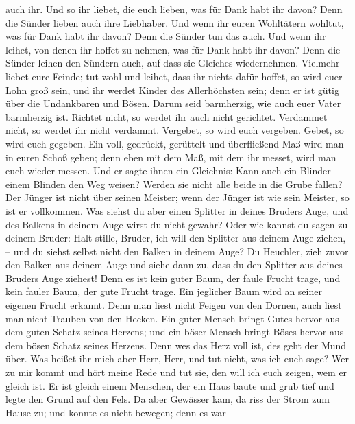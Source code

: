 auch ihr.  Und so ihr liebet, die euch lieben, was für Dank
habt ihr davon? Denn die Sünder lieben auch ihre Liebhaber.
 Und wenn ihr euren Wohltätern wohltut, was für Dank habt
ihr davon? Denn die Sünder tun das auch.  Und wenn ihr
leihet, von denen ihr hoffet zu nehmen, was für Dank habt ihr davon?
Denn die Sünder leihen den Sündern auch, auf dass sie Gleiches
wiedernehmen.  Vielmehr liebet eure Feinde; tut wohl und
leihet, dass ihr nichts dafür hoffet, so wird euer Lohn groß sein, und
ihr werdet Kinder des Allerhöchsten sein; denn er ist gütig über die
Undankbaren und Bösen.  Darum seid barmherzig, wie auch
euer Vater barmherzig ist.  Richtet nicht, so werdet ihr
auch nicht gerichtet. Verdammet nicht, so werdet ihr nicht verdammt.
Vergebet, so wird euch vergeben.  Gebet, so wird euch
gegeben. Ein voll, gedrückt, gerüttelt und überfließend Maß wird man in
euren Schoß geben; denn eben mit dem Maß, mit dem ihr messet, wird man
euch wieder messen.  Und er sagte ihnen ein Gleichnis: Kann
auch ein Blinder einem Blinden den Weg weisen? Werden sie nicht alle
beide in die Grube fallen?  Der Jünger ist nicht über
seinen Meister; wenn der Jünger ist wie sein Meister, so ist er
vollkommen.  Was siehst du aber einen Splitter in deines
Bruders Auge, und des Balkens in deinem Auge wirst du nicht gewahr?
 Oder wie kannst du sagen zu deinem Bruder: Halt stille,
Bruder, ich will den Splitter aus deinem Auge ziehen, -- und du siehst
selbst nicht den Balken in deinem Auge? Du Heuchler, zieh zuvor den
Balken aus deinem Auge und siehe dann zu, dass du den Splitter aus
deines Bruders Auge ziehest!  Denn es ist kein guter Baum,
der faule Frucht trage, und kein fauler Baum, der gute Frucht trage.
 Ein jeglicher Baum wird an seiner eigenen Frucht erkannt.
Denn man liest nicht Feigen von den Dornen, auch liest man nicht Trauben
von den Hecken.  Ein guter Mensch bringt Gutes hervor aus
dem guten Schatz seines Herzens; und ein böser Mensch bringt Böses
hervor aus dem bösen Schatz seines Herzens. Denn wes das Herz voll ist,
des geht der Mund über.  Was heißet ihr mich aber Herr,
Herr, und tut nicht, was ich euch sage?  Wer zu mir kommt
und hört meine Rede und tut sie, den will ich euch zeigen, wem er gleich
ist.  Er ist gleich einem Menschen, der ein Haus baute und
grub tief und legte den Grund auf den Fels. Da aber Gewässer kam, da
riss der Strom zum Hause zu; und konnte es nicht bewegen; denn es war
